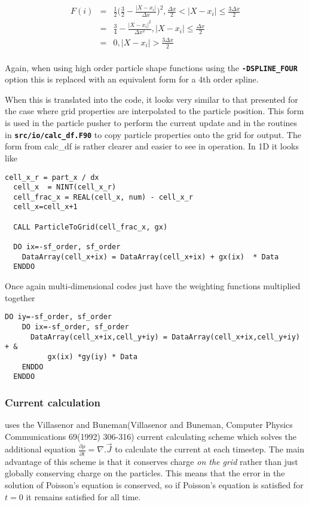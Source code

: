 \documentclass[12pt,a4paper]{article}
\newcommand{\simpleboxverbatim}{\begin{Verbatim}[obeytabs=true,frame=single,
  framerule=0.5mm,rulecolor=\color{warwickmid},formatcom=\color{black}]}
\newcommand{\inlinecode}[1]{{\color{warwickred} \bf\texttt{#1}}}
\newcommand{\EPOCH}{{\color{warwickdark}\fontfamily{phv}\selectfont{EPOCH}}}
\begin{document}
\begin{eqnarray*}
  F(i) &=& \frac{1}{2} \bigl(\frac{3}{2} - \frac{|X - x_i|}{\Delta x} \bigr)^2, \frac{\Delta x}{2} < |X-x_i| \le \frac{3 \Delta x}{2}\\
  &=& \frac{3}{4} - \frac{|X-x_i|^2}{\Delta x^2}, |X-x_i| \le \frac{\Delta x}{2}\\
  &=& 0, |X-x_i| > \frac{3 \Delta x}{2}\\
\end{eqnarray*}

Again, when using high order particle shape functions using the
\inlinecode{-DSPLINE\_FOUR} option this is replaced with an equivalent form for
a 4th order spline.

When this is translated into the code, it looks very similar to that presented
for the case where grid properties are interpolated to the particle
position. This form is used in the particle pusher to perform the current
update and in the routines in \inlinecode{src/io/calc\_df.F90} to copy particle
properties onto the grid for output. The form from calc\_df is rather clearer
and easier to see in operation. In 1D it looks like

\simpleboxverbatim
  cell_x_r = part_x / dx
  cell_x  = NINT(cell_x_r)
  cell_frac_x = REAL(cell_x, num) - cell_x_r
  cell_x=cell_x+1

  CALL ParticleToGrid(cell_frac_x, gx)

  DO ix=-sf_order, sf_order
    DataArray(cell_x+ix) = DataArray(cell_x+ix) + gx(ix)  * Data
  ENDDO
\end{Verbatim}

Once again multi-dimensional codes just have the weighting functions multiplied
together
\simpleboxverbatim
  DO iy=-sf_order, sf_order
    DO ix=-sf_order, sf_order
      DataArray(cell_x+ix,cell_y+iy) = DataArray(cell_x+ix,cell_y+iy) + &
          gx(ix) *gy(iy) * Data
    ENDDO
  ENDDO
\end{Verbatim}

\subsubsection{Current calculation}
{\EPOCH} uses the Villasenor and Buneman(Villasenor and Buneman, Computer Physics
Communications 69(1992) 306-316) current calculating scheme which solves the
additional equation $\frac{\partial \rho}{\partial t} = \nabla . \vec{J}$ to
calculate the current at each timestep. The main advantage of this scheme is
that it conserves charge {\it on the grid} rather than just globally conserving
charge on the particles. This means that the error in the solution of Poisson's
equation is conserved, so if Poisson's equation is satisfied for $t=0$ it
remains satisfied for all time.\\
\end{document}

